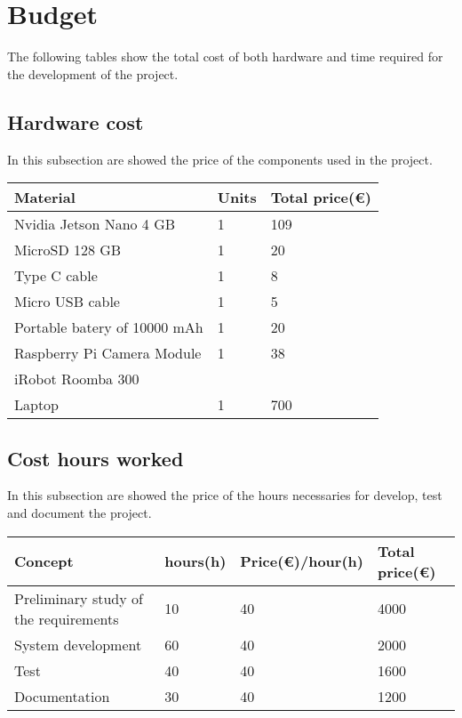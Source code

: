 \section{Budget}
{The following tables show the total cost of both hardware and time required for the development of the project. }

\subsection{Hardware cost}
{In this subsection are showed the price of the components used in the project.}

\begin{center}
\centering
\begin{tabular}{lll}
  \toprule
  Material  & Units & Total price(\euro) \\
  \midrule
	Nvidia Jetson Nano 4 GB & 1 &  109 \\
	MicroSD 128 GB	& 1 & 20 \\
	Type C cable & 1 & 8\\
	Micro USB cable & 1 & 5\\
	Portable batery of 10000 mAh & 1 & 20\\
	Raspberry Pi Camera Module & 1 & 38\\
	iRobot Roomba 300\\
	Laptop & 1 & 700\\
  \bottomrule
\end{tabular}
\end{center}


\subsection{Cost hours worked}
{In this subsection are showed the price of the hours necessaries for develop, test and document the project.}

\begin{center}
\centering
\begin{tabular}{llll}
  \toprule
  Concept  & hours(h) & Price(\euro)/hour(h) & Total price(\euro) \\
  \midrule
	Preliminary study of the requirements & 10 & 40 & 4000\\
	System development & 60 & 40 & 2000\\
	Test & 40 & 40 & 1600\\
	Documentation & 30 & 40 & 1200\\
  \bottomrule
\end{tabular}
\end{center}

